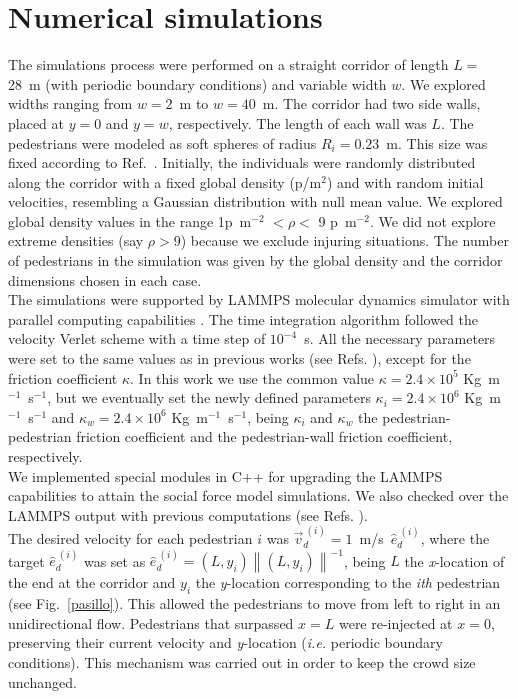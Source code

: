 \section{\label{simulations}Numerical simulations}

The simulations process were performed on a straight corridor of length $L=$ 28~m (with periodic boundary conditions) and variable width $w$. We explored widths ranging from $w=2$~m to $w=40$~m. The corridor had two side walls, placed at $y=0$ and $y=w$, respectively. The length of each wall was $L$. The pedestrians were modeled as soft spheres of radius $R_i=0.23$~m. This size was fixed according to Ref.~\cite{metric_handbook}. Initially, the individuals were randomly distributed along the corridor with a fixed global density (p/m$^{2}$) and with random initial velocities, resembling a Gaussian distribution with null mean value. We explored global density values in the range 1p~m$^{-2}$ $<\rho<$ 9 p~m$^{-2}$. We did not explore extreme densities (say $\rho>9$) because we exclude injuring situations. The number of pedestrians in the simulation was given by the global density and the corridor dimensions chosen in each case. \\

The simulations were supported by LAMMPS molecular dynamics simulator with parallel computing capabilities \cite{plimpton}.
The time integration algorithm followed the velocity Verlet scheme with a time step of $10^{-4}$~s. All the necessary parameters
were set to the same values as in previous works (see Refs. \cite{sticco,Dorso5}), except for the friction coefficient $\kappa$. In this work we use the common value $\kappa=2.4 \times 10^{5}$ Kg~m$^{-1}$~s$^{-1}$, but we eventually set the newly defined parameters $\kappa_i=2.4 \times 10^{6}$ Kg~m$^{-1}$~s$^{-1}$  and $\kappa_w=2.4 \times 10^{6}$ Kg~m$^{-1}$~s$^{-1}$, being $\kappa_i$ and $\kappa_w$ the pedestrian-pedestrian friction coefficient and the pedestrian-wall friction coefficient, respectively. \\

We implemented special modules in C++ for upgrading the LAMMPS capabilities to attain the social force model simulations. We also checked over the LAMMPS output with previous computations (see Refs. \cite{Dorso1, Dorso2,Dorso3, Dorso4,Dorso6}).\\

The desired velocity for each pedestrian $i$ was $\vec{v}_d^{~(i)}=1$~m/s~$\hat{e}_d^{~(i)}$, where the target $\hat{e}_d^{~(i)}$ was set as $\hat{e}_d^{~(i)}=(L,y_i)\left \| (L,y_i) \right \|^{-1}$, being $L$ the \textit{x}-location of the end at the corridor and $y_i$ the \textit{y}-location corresponding to the \textit{ith} pedestrian (see Fig.~\ref{pasillo}). This allowed the pedestrians to move from left to right in an unidirectional flow. Pedestrians that surpassed $x=L$ were re-injected at $x=0$, preserving their current velocity and \textit{y}-location (\textit{i.e.} periodic boundary conditions). This mechanism was carried out in order to keep
the crowd size unchanged.\\

